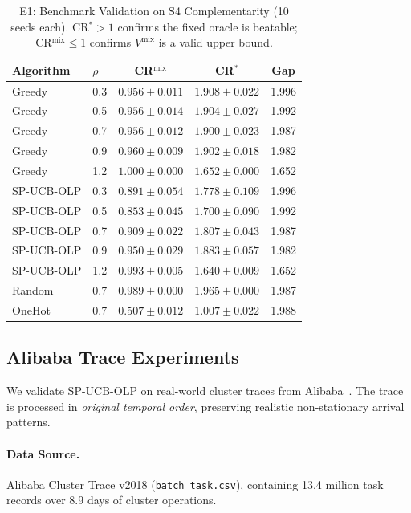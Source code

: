 \documentclass[11pt]{article}
\begin{document}
\begin{table}[h]
\centering
\caption{E1: Benchmark Validation on S4 Complementarity (10 seeds each). CR$^* > 1$ confirms the fixed oracle is beatable; CR$^{\mathrm{mix}} \le 1$ confirms $V^{\mathrm{mix}}$ is a valid upper bound.}
\label{tab:e1-full}
\begin{tabular}{llccc}
\toprule
Algorithm & $\rho$ & CR$^{\mathrm{mix}}$ & CR$^*$ & Gap \\
\midrule
Greedy & 0.3 & $0.956 \pm 0.011$ & $1.908 \pm 0.022$ & 1.996 \\
Greedy & 0.5 & $0.956 \pm 0.014$ & $1.904 \pm 0.027$ & 1.992 \\
Greedy & 0.7 & $0.956 \pm 0.012$ & $1.900 \pm 0.023$ & 1.987 \\
Greedy & 0.9 & $0.960 \pm 0.009$ & $1.902 \pm 0.018$ & 1.982 \\
Greedy & 1.2 & $1.000 \pm 0.000$ & $1.652 \pm 0.000$ & 1.652 \\
\midrule
SP-UCB-OLP & 0.3 & $0.891 \pm 0.054$ & $1.778 \pm 0.109$ & 1.996 \\
SP-UCB-OLP & 0.5 & $0.853 \pm 0.045$ & $1.700 \pm 0.090$ & 1.992 \\
SP-UCB-OLP & 0.7 & $0.909 \pm 0.022$ & $1.807 \pm 0.043$ & 1.987 \\
SP-UCB-OLP & 0.9 & $0.950 \pm 0.029$ & $1.883 \pm 0.057$ & 1.982 \\
SP-UCB-OLP & 1.2 & $0.993 \pm 0.005$ & $1.640 \pm 0.009$ & 1.652 \\
\midrule
Random & 0.7 & $0.989 \pm 0.000$ & $1.965 \pm 0.000$ & 1.987 \\
OneHot & 0.7 & $0.507 \pm 0.012$ & $1.007 \pm 0.022$ & 1.988 \\
\bottomrule
\end{tabular}
\end{table}

\subsection{Alibaba Trace Experiments}
\label{app:alibaba}

We validate SP-UCB-OLP on real-world cluster traces from Alibaba~\citep{alibaba2018}. The trace is processed in \emph{original temporal order}, preserving realistic non-stationary arrival patterns.

\paragraph{Data Source.}
Alibaba Cluster Trace v2018 (\texttt{batch\_task.csv}), containing 13.4 million task records over 8.9 days of cluster operations.
\end{document}

